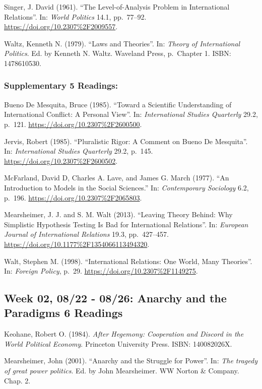 \documentclass[10pt,]{article}
\begin{document}
Singer, J. David (1961). ``The Level-of-Analysis Problem in
International Relations''. In: \emph{World Politics} 14.1, pp.~77--92.
\url{https://doi.org/10.2307\%2F2009557}.

Waltz, Kenneth N. (1979). ``Laws and Theories''. In:
\emph{Theory of International Politics}. Ed. by Kenneth N. Waltz.
Waveland Press, p.~Chapter 1. ISBN: 1478610530.

\subsubsection{Supplementary \textbar{} 5
Readings:}\label{supplementary-5-readings}

Bueno De Mesquita, Bruce (1985). ``Toward a Scientific Understanding of
International Conflict: A Personal View''. In:
\emph{International Studies Quarterly} 29.2, p.~121.
\url{https://doi.org/10.2307\%2F2600500}.

Jervis, Robert (1985). ``Pluralistic Rigor: A Comment on Bueno De
Mesquita''. In: \emph{International Studies Quarterly} 29.2, p.~145.
\url{https://doi.org/10.2307\%2F2600502}.

McFarland, David D, Charles A. Lave, and James G. March (1977). ``An
Introduction to Models in the Social Sciences.'' In:
\emph{Contemporary Sociology} 6.2, p.~196.
\url{https://doi.org/10.2307\%2F2065803}.

Mearsheimer, J. J. and S. M. Walt (2013). ``Leaving Theory Behind: Why
Simplistic Hypothesis Testing Is Bad for International Relations''. In:
\emph{European Journal of International Relations} 19.3, pp.~427--457.
\url{https://doi.org/10.1177\%2F1354066113494320}.

Walt, Stephen M. (1998). ``International Relations: One World, Many
Theories''. In: \emph{Foreign Policy}, p.~29.
\url{https://doi.org/10.2307\%2F1149275}.

\subsection{Week 02, 08/22 - 08/26: Anarchy and the Paradigms \textbar{}
6
Readings}\label{week-02-0822---0826-anarchy-and-the-paradigms-6-readings}

Keohane, Robert O. (1984).
\emph{After Hegemony: Cooperation and Discord in the World Political Economy}.
Princeton University Press. ISBN: 140082026X.

Mearsheimer, John (2001). ``Anarchy and the Struggle for Power''. In:
\emph{The tragedy of great power politics}. Ed. by John Mearsheimer. WW
Norton \& Company. Chap. 2.
\end{document}
